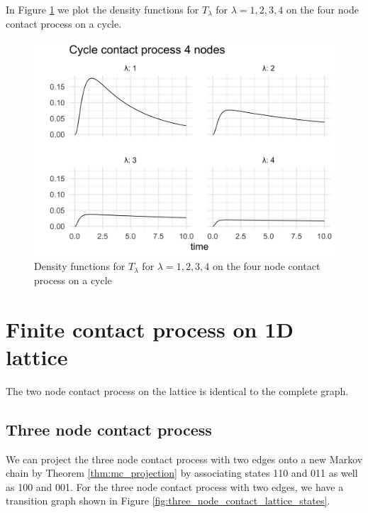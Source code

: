 \documentclass{article}
\theoremstyle{plain}
\theoremstyle{definition}
\theoremstyle{remark}
\numberwithin{equation}{section}
\begin{document}
In Figure \ref{fig:contact_4_cycle_phase_densities} we plot the density functions for $T_\lambda$ for $\lambda = 1, 2, 3, 4$ on the four node contact process on a cycle.

\begin{figure}
  \centering
    \includegraphics[width=.80\textwidth]{figures/cycle_4_contact_phase_densities.png}
   \caption{Density functions for $T_\lambda$ for $\lambda = 1, 2, 3, 4$ on the four node contact process on a cycle}
  \label{fig:contact_4_cycle_phase_densities}
\end{figure}

\section{Finite contact process on 1D lattice}

The two node contact process on the lattice is identical to the complete graph.

\subsection{Three node contact process}
We can project the three node contact process with two edges onto a new Markov chain by Theorem \ref{thm:mc_projection} by associating states 110 and 011 as well as 100 and 001.
For the three node contact process with two edges, we have a transition graph shown in Figure \ref{fig:three_node_contact_lattice_states}.
\end{document}
